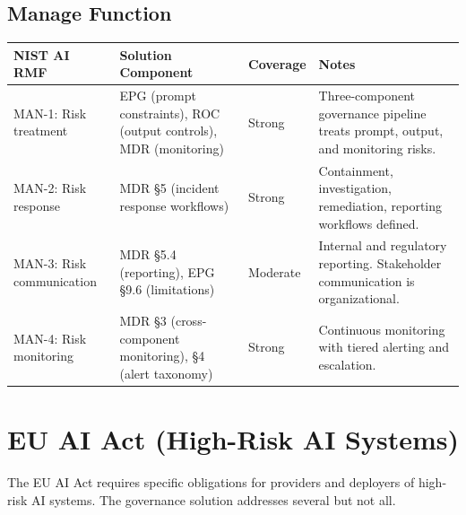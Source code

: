 \subsection{Manage Function}


\begin{table}[ht]
  \centering\small
  \begin{tabular}{@{}>{\raggedright\arraybackslash}p{1.90cm}>{\raggedright\arraybackslash}p{4.93cm}>{\raggedright\arraybackslash}p{1.11cm}>{\raggedright\arraybackslash}p{6.07cm}@{}}
  \toprule
  NIST AI RMF & Solution Component & Coverage & Notes \\
  \midrule
  MAN-1: Risk treatment & EPG (prompt constraints), ROC (output controls), MDR (monitoring) & Strong & Three-component governance pipeline treats prompt, output, and monitoring risks. \\
  MAN-2: Risk response & MDR \S{}5 (incident response workflows) & Strong & Containment, investigation, remediation, reporting workflows defined. \\
  MAN-3: Risk communication & MDR \S{}5.4 (reporting), EPG \S{}9.6 (limitations) & Moderate & Internal and regulatory reporting. Stakeholder communication is organizational. \\
  MAN-4: Risk monitoring & MDR \S{}3 (cross-component monitoring), \S{}4 (alert taxonomy) & Strong & Continuous monitoring with tiered alerting and escalation. \\
  \bottomrule
  \end{tabular}
\end{table}




\section{EU AI Act (High-Risk AI Systems)}
\label{sec:regmap-2}


The EU AI Act requires specific obligations for providers and deployers of high-risk AI systems. The governance solution addresses several but not all.

